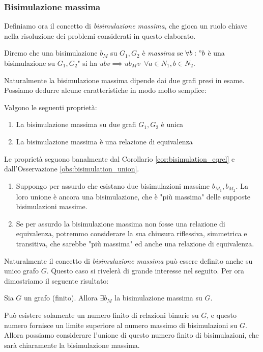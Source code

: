 \subsubsection{Bisimulazione massima}
\label{sec:bisi_max}
Definiamo ora il concetto di \emph{bisimulazione massima}, che gioca un ruolo chiave nella risoluzione dei problemi considerati in questo elaborato.
\begin{definition}
    Diremo che una bisimulazione $b_M$ su $G_1, G_2$ è \emph{massima} se $\forall b : "b$ è una bisimulazione su $G_1, G_2$" si ha $u b v \implies u b_M v \,\,\,\forall a \in N_1, b \in N_2$.
\end{definition}
Naturalmente la bisimulazione massima dipende dai due grafi presi in esame. Possiamo dedurre alcune caratteristiche in modo molto semplice:
\begin{proposition}
    Valgono le seguenti proprietà:
    \begin{enumerate}
        \item La bisimulazione massima su due grafi $G_1,G_2$ è unica
        \item La bisimulazione massima è una relazione di equivalenza
    \end{enumerate}
\end{proposition}
\begin{proof2}
    Le proprietà seguono banalmente dal Corollario \ref*{cor:bisimulation_eqrel} e dall'Osservazione \ref*{obs:bisimulation_union}.
    \begin{enumerate}
        \item Suppongo per assurdo che esistano due bisimulazioni massime $b_{M_1}, b_{M_2}$. La loro unione è ancora una bisimulazione, che è "più massima" delle supposte bisimulazioni massime.
        \item Se per assurdo la bisimulazione massima non fosse una relazione di equivalenza, potremmo considerare la sua chiusura riflessiva, simmetrica e transitiva, che sarebbe "più massima" ed anche una relazione di equivalenza.
    \end{enumerate}
\end{proof2}
Naturalmente il concetto di \emph{bisimulazione massima} può essere definito anche su unico grafo $G$. Questo caso si rivelerà di grande interesse nel seguito. Per
ora dimostriamo il seguente risultato:
\begin{theorem}
    Sia $G$ un grafo (finito). Allora $\exists b_M$ la bisimulazione massima su $G$.
\end{theorem}
\begin{proof2}
    Può esistere solamente un numero finito di relazioni binarie su $G$, e questo numero fornisce un limite superiore al numero massimo di bisimulazioni su $G$.
    Allora possiamo considerare l'unione di questo numero finito di bisimulazioni, che sarà chiaramente la bisimulazione massima.
\end{proof2}

